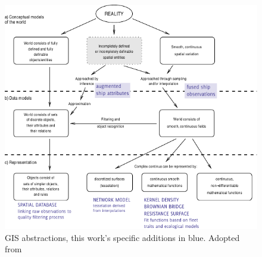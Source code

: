\documentclass[12pt,letterpaper]{article}
\begin{document}



\begin{figure}[htbp]
  \centering
  \includegraphics[width=160mm]{figures/representation-in-gis.pdf}
  \caption{GIS abstractions, this work's specific {\color{DBlue} additions in blue}. Adopted from \cite{Bivand2011}}
  \label{fig:representation-in-gis}
\end{figure}


\end{document}
